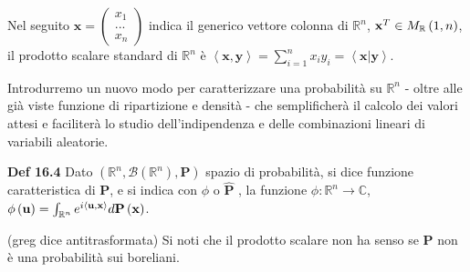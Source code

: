 \documentclass{article}
\begin{document}
Nel seguito $\mathbf{x=}\left( 
\begin{array}{c}
x_{1} \\ 
... \\ 
x_{n}%
\end{array}%
\right) $ indica il generico vettore colonna di $%
\mathbb{R}
^{n}$, $\mathbf{x}^{T}\in M_{%
\mathbb{R}
}\left( 1,n\right) $, il prodotto scalare standard di $%
\mathbb{R}
^{n}$ \`{e} $\left\langle \mathbf{x,y}\right\rangle
=\sum_{i=1}^{n}x_{i}y_{i}=\left\langle \mathbf{x|y}\right\rangle $.

Introdurremo un nuovo modo per caratterizzare una probabilit\`{a} su $%
\mathbb{R}
^{n}$ - oltre alle gi\`{a} viste funzione di ripartizione e densit\`{a} -
che semplificher\`{a} il calcolo dei valori attesi e faciliter\`{a} lo
studio dell'indipendenza e delle combinazioni lineari di variabili aleatorie.

\textbf{Def 16.4} Dato $\left( 
\mathbb{R}
^{n},\mathcal{B}\left( 
\mathbb{R}
^{n}\right) ,\mathbf{P}\right) $ spazio di probabilit\`{a}, si dice funzione
caratteristica di $\mathbf{P}$, e si indica con $\phi $ o $\mathbf{\hat{P}}$%
, la funzione $\phi :%
\mathbb{R}
^{n}\rightarrow 
\mathbb{C}
$, $\phi \left( \mathbf{u}\right) =\int_{%
\mathbb{R}
^{n}}e^{i\left\langle \mathbf{u},\mathbf{x}\right\rangle }d\mathbf{P}\left( 
\mathbf{x}\right) $.

(greg dice antitrasformata) Si noti che il prodotto scalare non ha senso se $%
\mathbf{P}$ non \`{e} una probabilit\`{a} sui boreliani.
\end{document}
